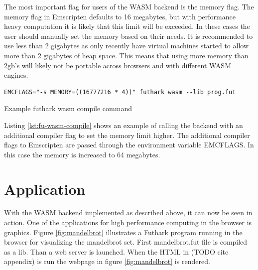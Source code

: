 \documentclass[11pt]{book}
\begin{document}
The most important flag for users of the WASM backend is the memory flag. The memory flag in Emscripten defaults to 16 megabytes, but with performance heavy computation it is likely that this limit will be exceeded. In these cases the user should manually set the memory based on their needs. It is recommended to use less than 2 gigabytes as only recently have virtual machines started to allow more than 2 gigabytes of heap space. This means that using more memory than 2gb's will likely not be portable across browsers and with different WASM engines. 

\begin{listing}
\begin{verbatim}
EMCFLAGS="-s MEMORY=((16777216 * 4))" futhark wasm --lib prog.fut
\end{verbatim}
\caption{Example futhark wasm compile command}
\label{lst:fu-wasm-compile}
\end{listing}

Listing \ref{lst:fu-wasm-compile} shows an example of calling the backend with an additional compiler flag to set the memory limit higher. The additional compiler flags to Emscripten are passed through the environment variable EMCFLAGS. In this case the memory is increased to 64 megabytes.
\section{Application}

With the WASM backend implemented as described above, it can now be seen in action. One of the applications for high performance computing in the browser is graphics. Figure \ref{fig:mandelbrot} illustrates a Futhark program running in the browser for visualizing the mandelbrot set. First mandelbrot.fut file is compiled as a lib. Than a web server is launched. When the HTML in (TODO cite appendix) is run the webpage in figure \ref{fig:mandelbrot} is rendered.
\end{document}
